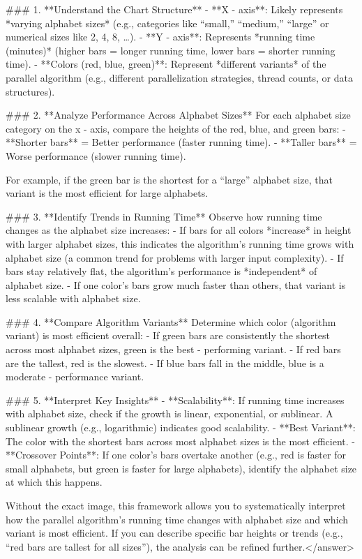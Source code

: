 ### 1. **Understand the Chart Structure**  
- **X - axis**: Likely represents *varying alphabet sizes* (e.g., categories like “small,” “medium,” “large” or numerical sizes like 2, 4, 8, …).  
- **Y - axis**: Represents *running time (minutes)* (higher bars = longer running time, lower bars = shorter running time).  
- **Colors (red, blue, green)**: Represent *different variants* of the parallel algorithm (e.g., different parallelization strategies, thread counts, or data structures).  


### 2. **Analyze Performance Across Alphabet Sizes**  
For each alphabet size category on the x - axis, compare the heights of the red, blue, and green bars:  
- **Shorter bars** = Better performance (faster running time).  
- **Taller bars** = Worse performance (slower running time).  

For example, if the green bar is the shortest for a “large” alphabet size, that variant is the most efficient for large alphabets.  


### 3. **Identify Trends in Running Time**  
Observe how running time changes as the alphabet size increases:  
- If bars for all colors *increase* in height with larger alphabet sizes, this indicates the algorithm’s running time grows with alphabet size (a common trend for problems with larger input complexity).  
- If bars stay relatively flat, the algorithm’s performance is *independent* of alphabet size.  
- If one color’s bars grow much faster than others, that variant is less scalable with alphabet size.  


### 4. **Compare Algorithm Variants**  
Determine which color (algorithm variant) is most efficient overall:  
- If green bars are consistently the shortest across most alphabet sizes, green is the best - performing variant.  
- If red bars are the tallest, red is the slowest.  
- If blue bars fall in the middle, blue is a moderate - performance variant.  


### 5. **Interpret Key Insights**  
- **Scalability**: If running time increases with alphabet size, check if the growth is linear, exponential, or sublinear. A sublinear growth (e.g., logarithmic) indicates good scalability.  
- **Best Variant**: The color with the shortest bars across most alphabet sizes is the most efficient.  
- **Crossover Points**: If one color’s bars overtake another (e.g., red is faster for small alphabets, but green is faster for large alphabets), identify the alphabet size at which this happens.  


Without the exact image, this framework allows you to systematically interpret how the parallel algorithm’s running time changes with alphabet size and which variant is most efficient. If you can describe specific bar heights or trends (e.g., “red bars are tallest for all sizes”), the analysis can be refined further.</answer>